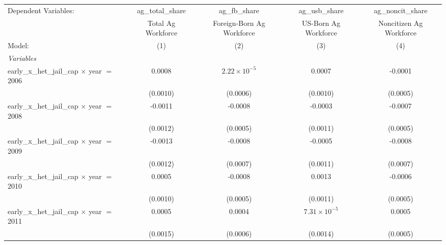 
\begingroup
\centering
\begin{tabular}{lcccc}
   \tabularnewline \midrule \midrule
   Dependent Variables:                                 & ag\_total\_share      & ag\_fb\_share             & ag\_usb\_share         & ag\_noncit\_share\\    
                                                        & Total Ag Workforce    & Foreign-Born Ag Workforce & US-Born Ag Workforce   & Noncitizen Ag Workforce \\   
   Model:                                               & (1)                   & (2)                       & (3)                    & (4)\\  
   \midrule
   \emph{Variables}\\
   early\_x\_het\_jail\_cap $\times$ year $=$ 2006      & 0.0008                & $2.22\times 10^{-5}$      & 0.0007                 & -0.0001\\   
                                                        & (0.0010)              & (0.0006)                  & (0.0010)               & (0.0005)\\   
   early\_x\_het\_jail\_cap $\times$ year $=$ 2008      & -0.0011               & -0.0008                   & -0.0003                & -0.0007\\   
                                                        & (0.0012)              & (0.0005)                  & (0.0011)               & (0.0005)\\   
   early\_x\_het\_jail\_cap $\times$ year $=$ 2009      & -0.0013               & -0.0008                   & -0.0005                & -0.0008\\   
                                                        & (0.0012)              & (0.0007)                  & (0.0011)               & (0.0007)\\   
   early\_x\_het\_jail\_cap $\times$ year $=$ 2010      & 0.0005                & -0.0008                   & 0.0013                 & -0.0006\\   
                                                        & (0.0010)              & (0.0005)                  & (0.0011)               & (0.0005)\\   
   early\_x\_het\_jail\_cap $\times$ year $=$ 2011      & 0.0005                & 0.0004                    & $7.31\times 10^{-5}$   & 0.0005\\   
                                                        & (0.0015)              & (0.0006)                  & (0.0014)               & (0.0005)\\   

\end{tabular}
